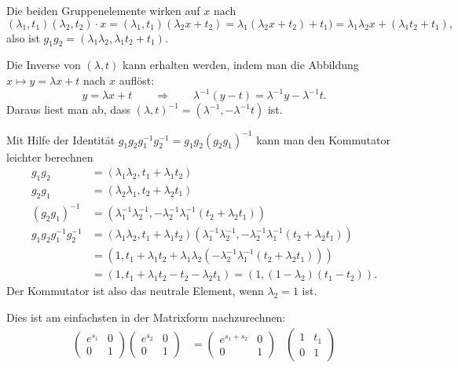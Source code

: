 \begin{loesung}
\begin{teilaufgaben}
\item
Die beiden Gruppenelemente wirken auf $x$ nach
\[
(\lambda_1,t_1)
(\lambda_2,t_2)
\cdot
x
=
(\lambda_1,t_1)(\lambda_2x+t_2)
=
\lambda_1(\lambda_2x+t_2)+t_1)
=
\lambda_1\lambda_2 x + (\lambda_1t_2+t_1),
\]
also ist $g_1g_2=(\lambda_1\lambda_2,\lambda_1t_2+t_1)$.
\item
Die Inverse von $(\lambda,t)$ kann erhalten werden, indem man die
Abbildung $x\mapsto y=\lambda x +t$ nach $x$ auflöst:
\[
y=\lambda x+t
\qquad\Rightarrow\qquad
\lambda^{-1}(y-t)
=
\lambda^{-1}y - \lambda^{-1}t.
\]
Daraus liest man ab, dass $(\lambda,t)^{-1}=(\lambda^{-1},-\lambda^{-1}t)$
ist.
\item
Mit Hilfe der Identität $g_1g_2g_1^{-1}g_2^{-1}=g_1g_2(g_2g_1)^{-1}$
kann man den Kommutator leichter berechnen
\begin{align*}
g_1g_2&=(\lambda_1\lambda_2,t_1+\lambda_1t_2)
\\
g_2g_1&= (\lambda_2\lambda_1,t_2+\lambda_2t_1)
\\
(g_2g_1)^{-1}
&=
(\lambda_1^{-1}\lambda_2^{-1},
	-\lambda_2^{-1}\lambda_1^{-1}(t_2+\lambda_2t_1))
\\
g_1g_2g_1^{-1}g_2^{-1}
&=
(\lambda_1\lambda_2,t_1+\lambda_1t_2)
(\lambda_1^{-1}\lambda_2^{-1},
	-\lambda_2^{-1}\lambda_1^{-1}(t_2+\lambda_2t_1))
\\
&=(1,t_1+\lambda_1t_2 + \lambda_1\lambda_2(
	-\lambda_2^{-1}\lambda_1^{-1}(t_2+\lambda_2t_1))
)
\\
&=(1, t_1+\lambda_1t_2 - t_2 -\lambda_2t_1)
=
(1,(1-\lambda_2)(t_1-t_2)).
\end{align*}
Der Kommutator ist also das neutrale Element, wenn $\lambda_2=1$ ist.
\item
Dies ist am einfachsten in der Matrixform nachzurechnen:
\begin{align*}
\begin{pmatrix} e^{s_1}&0\\0&1\end{pmatrix}
\begin{pmatrix} e^{s_2}&0\\0&1\end{pmatrix}
&=
\begin{pmatrix}e^{s_1+s_2}&0\\0&1\end{pmatrix}
&
\begin{pmatrix} 1&t_1\\0&1\end{pmatrix}

\end{align*}
\end{teilaufgaben}
\end{loesung}

